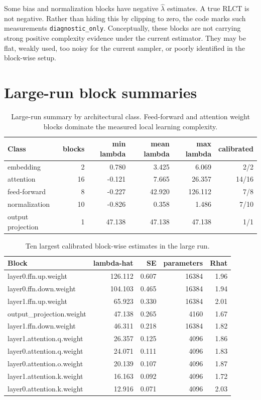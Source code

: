 \documentclass[11pt]{article}
\begin{document}
Some bias and normalization blocks have negative \(\hat\lambda\) estimates. A
true RLCT is not negative. Rather than hiding this by clipping to zero, the code
marks such measurements \texttt{diagnostic\_only}. Conceptually, these blocks are
not carrying strong positive complexity evidence under the current estimator.
They may be flat, weakly used, too noisy for the current sampler, or poorly
identified in the block-wise setup.

\section{Large-run block summaries}

\begin{table}[h]
\centering
\begin{tabular}{lrrrrr}
\toprule
Class & blocks & min lambda & mean lambda & max lambda & calibrated \\
\midrule
embedding & 2 & 0.780 & 3.425 & 6.069 & 2/2 \\
attention & 16 & -0.121 & 7.665 & 26.357 & 14/16 \\
feed-forward & 8 & -0.227 & 42.920 & 126.112 & 7/8 \\
normalization & 10 & -0.826 & 0.358 & 1.486 & 7/10 \\
output projection & 1 & 47.138 & 47.138 & 47.138 & 1/1 \\
\bottomrule
\end{tabular}
\caption{Large-run summary by architectural class. Feed-forward and attention
weight blocks dominate the measured local learning complexity.}
\end{table}

\begin{table}[h]
\centering
\begin{tabular}{lrrrr}
\toprule
Block & lambda-hat & SE & parameters & Rhat \\
\midrule
layer0.ffn.up.weight & 126.112 & 0.607 & 16384 & 1.96 \\
layer0.ffn.down.weight & 104.103 & 0.465 & 16384 & 1.94 \\
layer1.ffn.up.weight & 65.923 & 0.330 & 16384 & 2.01 \\
output\_projection.weight & 47.138 & 0.265 & 4160 & 1.67 \\
layer1.ffn.down.weight & 46.311 & 0.218 & 16384 & 1.82 \\
layer1.attention.q.weight & 26.357 & 0.125 & 4096 & 1.86 \\
layer0.attention.q.weight & 24.071 & 0.111 & 4096 & 1.83 \\
layer0.attention.o.weight & 20.139 & 0.107 & 4096 & 1.87 \\
layer1.attention.k.weight & 16.163 & 0.092 & 4096 & 1.72 \\
layer0.attention.k.weight & 12.916 & 0.071 & 4096 & 2.03 \\
\bottomrule
\end{tabular}
\caption{Ten largest calibrated block-wise estimates in the large run.}
\end{table}
\end{document}
